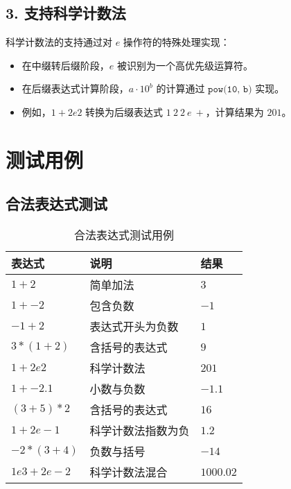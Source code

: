 \documentclass[12pt]{ctexart}
\begin{document}
\subsection*{3. 支持科学计数法}
科学计数法的支持通过对 $e$ 操作符的特殊处理实现：
\begin{itemize}
    \item 在中缀转后缀阶段，$e$ 被识别为一个高优先级运算符。
    \item 在后缀表达式计算阶段，$a \cdot 10^b$ 的计算通过 $\texttt{pow(10, b)}$ 实现。
    \item 例如，$1 + 2e2$ 转换为后缀表达式 $1\ 2\ 2\ e\ +$，计算结果为 $201$。
\end{itemize}

\section*{测试用例}

\subsection*{合法表达式测试}

\begin{table}[h!]
\centering
\begin{tabular}{|l|l|l|}
\hline
\textbf{表达式} & \textbf{说明}                & \textbf{结果} \\ \hline
$1+2$           & 简单加法                    & $3$          \\ \hline
$1+-2$          & 包含负数                    & $-1$         \\ \hline
$-1+2$          & 表达式开头为负数            & $1$          \\ \hline
$3*(1+2)$       & 含括号的表达式              & $9$          \\ \hline
$1+2e2$         & 科学计数法                  & $201$        \\ \hline
$1+-2.1$        & 小数与负数                  & $-1.1$       \\ \hline
$(3+5)*2$       & 含括号的表达式              & $16$         \\ \hline
$1+2e-1$        & 科学计数法指数为负          & $1.2$        \\ \hline
$-2*(3+4)$      & 负数与括号                  & $-14$        \\ \hline
$1e3+2e-2$      & 科学计数法混合              & $1000.02$    \\ \hline
\end{tabular}
\caption{合法表达式测试用例}
\end{table}
\end{document}
